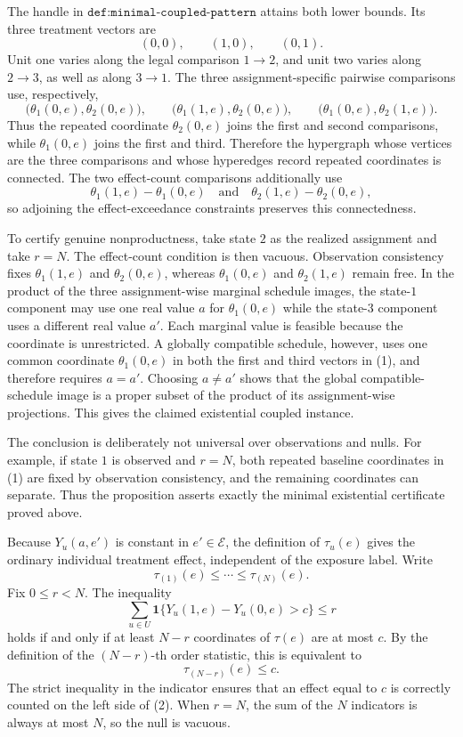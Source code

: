 The handle in \(\texttt{def:minimal-coupled-pattern}\) attains both lower bounds.  Its three treatment vectors are
\[
 (0,0),\qquad(1,0),\qquad(0,1).
\]
Unit one varies along the legal comparison \(1\to2\), and unit two varies along \(2\to3\), as well as along \(3\to1\).  The three assignment-specific pairwise comparisons use, respectively,
\[
 \bigl(\theta_1(0,e),\theta_2(0,e)\bigr),\qquad
 \bigl(\theta_1(1,e),\theta_2(0,e)\bigr),\qquad
 \bigl(\theta_1(0,e),\theta_2(1,e)\bigr).
\tag{1}
\]
Thus the repeated coordinate \(\theta_2(0,e)\) joins the first and second comparisons, while \(\theta_1(0,e)\) joins the first and third.  Therefore the hypergraph whose vertices are the three comparisons and whose hyperedges record repeated coordinates is connected.  The two effect-count comparisons additionally use
\[
 \theta_1(1,e)-\theta_1(0,e)
 \quad\text{and}\quad
 \theta_2(1,e)-\theta_2(0,e),
\]
so adjoining the effect-exceedance constraints preserves this connectedness.

To certify genuine nonproductness, take state \(2\) as the realized assignment and take \(r=N\).  The effect-count condition is then vacuous.  Observation consistency fixes \(\theta_1(1,e)\) and \(\theta_2(0,e)\), whereas \(\theta_1(0,e)\) and \(\theta_2(1,e)\) remain free.  In the product of the three assignment-wise marginal schedule images, the state-\(1\) component may use one real value \(a\) for \(\theta_1(0,e)\) while the state-\(3\) component uses a different real value \(a'\).  Each marginal value is feasible because the coordinate is unrestricted.  A globally compatible schedule, however, uses one common coordinate \(\theta_1(0,e)\) in both the first and third vectors in (1), and therefore requires \(a=a'\).  Choosing \(a\neq a'\) shows that the global compatible-schedule image is a proper subset of the product of its assignment-wise projections.  This gives the claimed existential coupled instance.

The conclusion is deliberately not universal over observations and nulls.  For example, if state \(1\) is observed and \(r=N\), both repeated baseline coordinates in (1) are fixed by observation consistency, and the remaining coordinates can separate.  Thus the proposition asserts exactly the minimal existential certificate proved above.

Because \(Y_u(a,e')\) is constant in \(e'\in\mathcal E\), the definition of \(\tau_u(e)\) gives the ordinary individual treatment effect, independent of the exposure label.  Write
\[
 \tau_{(1)}(e)\leq\cdots\leq\tau_{(N)}(e).
\]
Fix \(0\leq r<N\).  The inequality
\[
 \sum_{u\in U}\mathbf 1\{Y_u(1,e)-Y_u(0,e)>c\}\leq r
\tag{1}
\]
holds if and only if at least \(N-r\) coordinates of \(\tau(e)\) are at most \(c\).  By the definition of the \((N-r)\)-th order statistic, this is equivalent to
\[
 \tau_{(N-r)}(e)\leq c.
\tag{2}
\]
The strict inequality in the indicator ensures that an effect equal to \(c\) is correctly counted on the left side of (2).  When \(r=N\), the sum of the \(N\) indicators is always at most \(N\), so the null is vacuous.

